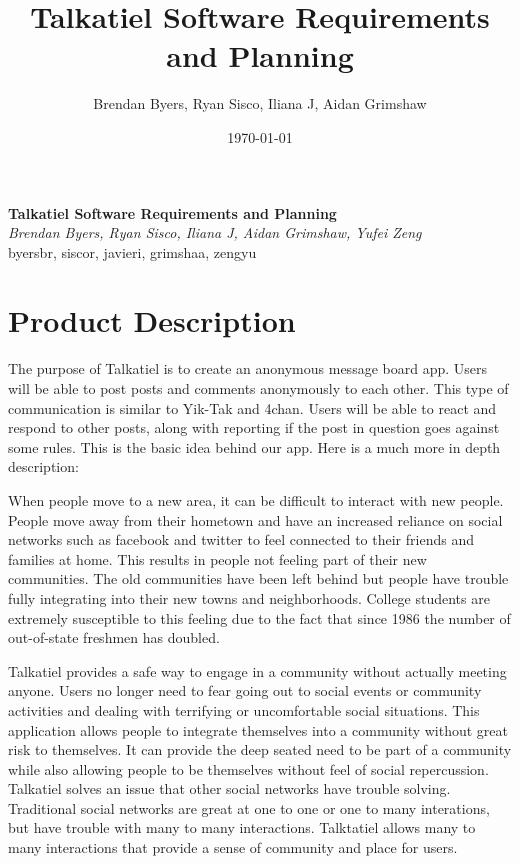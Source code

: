 \documentclass[12pt]{article}
\title{Talkatiel Software Requirements and Planning}
\author{Brendan Byers, Ryan Sisco, Iliana J, Aidan Grimshaw}
\date{\today}
\begin{document}
\begin{center}
      \Large\textbf{Talkatiel Software Requirements and Planning}\\
      \large\textit{Brendan Byers, Ryan Sisco, Iliana J, Aidan Grimshaw, Yufei Zeng}\\
      \large{byersbr, siscor, javieri, grimshaa, zengyu}\\
   \end{center}

\tableofcontents

\section{Product Description}
The purpose of Talkatiel is to create an anonymous message board app.  Users will be able to post posts and comments anonymously to each other.  This type of communication is similar to Yik-Tak and 4chan.  Users will be able to react and respond to other posts, along with reporting if the post in question goes against some rules.  This is the basic idea behind our app.  Here is a much more in depth description:

  When people move to a new area, it can be difficult to interact with new people.  People move away from their hometown and have an increased reliance on social networks such as facebook and twitter to feel connected to their friends and families at home.  This results in people not feeling part of their new communities.  The old communities have been left behind but people have trouble fully integrating into their new towns and neighborhoods.  College students are extremely susceptible to this feeling due to the fact that since 1986 the number of out-of-state freshmen has doubled\cite{item2}.

  Talkatiel provides a safe way to engage in a community without actually meeting anyone.  Users no longer need to fear going out to social events or community activities and dealing with terrifying or uncomfortable social situations.  This application allows people to integrate themselves into a community without great risk to themselves.  It can provide the deep seated need to be part of a community while also allowing people to be themselves without feel of social repercussion.  Talkatiel solves an issue that other social networks have trouble solving.  Traditional social networks are great at one to one or one to many interations, but have trouble with many to many interactions.  Talktatiel allows many to many interactions that provide a sense of community and place for users.
\end{document}
